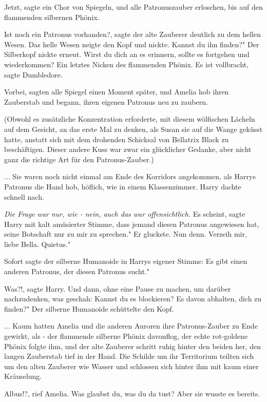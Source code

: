 \glqq{}Jetzt\grqq{}, sagte ein Chor von Spiegeln, und alle Patronuszauber
erloschen, bis auf den flammenden silbernen Phönix.

\glqq{}Ist noch ein Patronus vorhanden?\grqq{}, sagte der alte Zauberer deutlich
zu dem hellen Wesen. Das helle Wesen neigte den Kopf und nickte. \glqq{}Kannst du
ihn finden?" Der Silberkopf nickte erneut. \glqq{}Wirst du dich an es erinnern,
sollte es fortgehen und wiederkommen?\grqq{} Ein letztes Nicken des flammenden
Phönix. \glqq{}Es ist vollbracht\grqq{}, sagte Dumbledore.

\glqq{}Vorbei\grqq{}, sagten alle Spiegel einen Moment später, und Amelia hob
ihren Zauberstab und begann, ihren eigenen Patronus neu zu zaubern.

(Obwohl es zusätzliche Konzentration erforderte, mit diesem wölfischen Lächeln
auf dem Gesicht, an das erste Mal zu denken, als Susan sie auf die Wange geküsst
hatte, anstatt sich mit dem drohenden Schicksal von Bellatrix Black zu
beschäftigen. Dieser andere Kuss war zwar ein glücklicher Gedanke, aber nicht
ganz die richtige Art für den Patronus-Zauber.)

... Sie waren noch nicht einmal am Ende des Korridors angekommen, als Harrys
Patronus die Hand hob, höflich, wie in einem Klassenzimmer. Harry dachte schnell
nach.\emph{}

\emph{Die Frage war nur, wie - nein, auch das war offensichtlich.}
\glqq{}Es scheint\grqq{}, sagte Harry mit kalt amüsierter Stimme, \glqq{}dass
jemand diesen Patronus angewiesen hat, seine Botschaft nur zu mir zu sprechen."
Er gluckste. \glqq{}Nun denn. Verzeih mir, liebe Bella. Quietus."

Sofort sagte der silberne Humanoide in Harrys eigener Stimme: \glqq{}Es gibt
einen anderen Patronus, der diesen Patronus sucht."

\glqq{}Was?!\grqq{}, sagte Harry. Und dann, ohne eine Pause zu machen, um darüber
nachzudenken, was geschah: \glqq{}Kannst du es blockieren? Es davon abhalten,
dich zu finden?" Der silberne Humanoide schüttelte den Kopf.

... Kaum hatten Amelia und die anderen Auroren ihre Patronus-Zauber zu Ende
gewirkt, als - der flammende silberne Phönix davonflog, der echte rot-goldene
Phönix folgte ihm, und der alte Zauberer schritt ruhig hinter den beiden her,
den langen Zauberstab tief in der Hand. Die Schilde um ihr Territorium teilten
sich um den alten Zauberer wie Wasser und schlossen sich hinter ihm mit kaum
einer Kräuselung.

\glqq{}Albus!?\grqq{}, rief Amelia. \glqq{}Was glaubst du, was du da tust?\grqq{}
Aber sie wusste es bereits.

